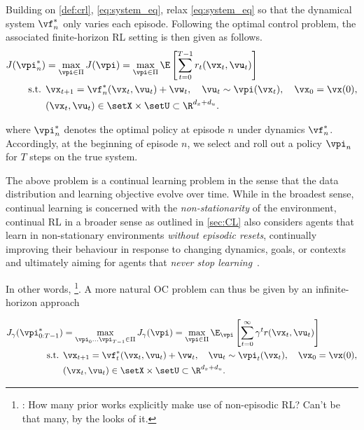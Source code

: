 \begin{problem}
\label{pr:finite_horizon_problem_episodic}
Building on \cref{def:crl}, \cref{eq:system_eq}, relax \cref{eq:system_eq} so that the dynamical system $\vf^*_n$ only varies each episode. Following the optimal control \citep[OC, c.f.][]{luenberger_oc_1971} problem, the associated finite-horizon RL setting \citep{puterman_markov_1994} is then given as follows.
\begin{align}
    J(\vpi^*_n)&=\max_{\vpi \in \Pi} J(\vpi) = \max_{\vpi \in \Pi} \E\left[\sum_{t=0}^{T-1} r_t(\vx_t, \vu_t)\right] \label{eq:finite_horizon_problem_episodic}\\
    \textrm{s.t. }&\vx_{t+1} = \vf^*_n(\vx_{t}, \vu_{t}) + \vw_t, \quad \vu_t \sim \vpi(\vx_t),\quad \vx_0 = \vx(0), \notag \\
    & (\vx_t, \vu_t) \in \setX \times \setU \subset \R^{d_x+d_u}.\notag
\end{align}
\end{problem}
where $\vpi^*_n$ denotes the optimal policy at episode $n$ under dynamics $\vf_n^*$. Accordingly, at the beginning of episode $n$, we select and roll out a policy $\vpi_n$ for $T$ steps on the true system.

The above problem is a continual learning problem in the sense that the data distribution and learning objective evolve over time. While in the broadest sense, continual learning is concerned with the \emph{non-stationarity} of the environment, continual RL in a broader sense as outlined in \cref{sec:CL} also considers agents that learn in non-stationary environments \textit{without episodic resets}, continually improving their behaviour in response to changing dynamics, goals, or contexts~\citep{khetarpal_towards_2022} and ultimately aiming for agents that \textit{never stop learning}~\citep{abel_definition_2023}. 

In other words, \footnote{\todo: How many prior works explicitly make use of non-episodic RL? Can't be that many, by the looks of it. }. A more natural OC problem can thus be given by an infinite-horizon approach

\begin{problem}
\label{pr:infinite_horizon_discounted}
\begin{align}
    J_\gamma(\vpi^*_{0:T-1})&=\max_{\vpi_0\ldots\vpi_{T-1} \in \Pi} J_{\gamma}(\vpi) = \max_{\vpi \in \Pi} \E_{\vpi} \left[ \sum^{\infty}_{t=0} \gamma^t r(\vx_t, \vu_t) \right] \label{eq:infinite_horizon_discounted}\\
    \textrm{s.t. }&\vx_{t+1} = \vf^*_t(\vx_{t}, \vu_{t}) + \vw_t, \quad \vu_t \sim \vpi_t(\vx_t),\quad \vx_0 = \vx(0), \notag \\
    & (\vx_t, \vu_t) \in \setX \times \setU \subset \R^{d_x+d_u}.\notag
\end{align}
\end{problem}

